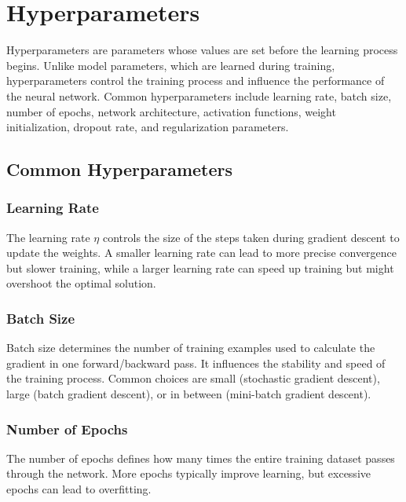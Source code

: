 \section{Hyperparameters}

    Hyperparameters are parameters whose values are set before the learning process begins. Unlike model parameters, which are learned during training, hyperparameters control the training process and influence the performance of the neural network. Common hyperparameters include learning rate, batch size, number of epochs, network architecture, activation functions, weight initialization, dropout rate, and regularization parameters.

    \subsection{Common Hyperparameters}

        \subsubsection{Learning Rate}

            The learning rate \( \eta \) controls the size of the steps taken during gradient descent to update the weights. A smaller learning rate can lead to more precise convergence but slower training, while a larger learning rate can speed up training but might overshoot the optimal solution.

        \subsubsection{Batch Size}

            Batch size determines the number of training examples used to calculate the gradient in one forward/backward pass. It influences the stability and speed of the training process. Common choices are small (stochastic gradient descent), large (batch gradient descent), or in between (mini-batch gradient descent).

        \subsubsection{Number of Epochs}

            The number of epochs defines how many times the entire training dataset passes through the network. More epochs typically improve learning, but excessive epochs can lead to overfitting.

